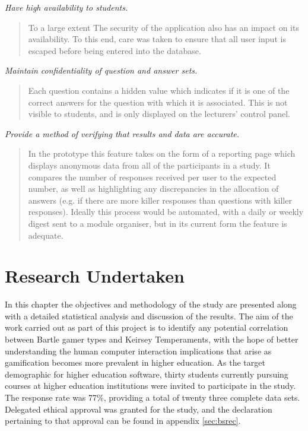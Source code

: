 \documentclass[12pt,a4paper,twoside]{report}
\begin{document}
\textit{Have high availability to students.}
\begin{quote}
To a large extent  The security of the application also has an impact on its availability. To this end, care was taken to ensure that all user input is escaped before being entered into the database.
\end{quote}
\textit{Maintain confidentiality of question and answer sets.}
\begin{quote}
Each question contains a hidden value which indicates if it is one of the correct answers for the question with which it is associated. This is not visible to students, and is only displayed on the lecturers' control panel.
\end{quote}
\textit{Provide a method of verifying that results and data are accurate.}
\begin{quote}
	In the prototype this feature takes on the form of a reporting page which displays anonymous data from all of the participants in a study. It compares the number of responses received per user to the expected number, as well as highlighting any discrepancies in the allocation of answers (e.g. if there are more killer responses than questions with killer responses). Ideally this process would be automated, with a daily or weekly digest sent to a module organiser, but in its current form the feature is adequate.
\end{quote}

\chapter{Research Undertaken}
\label{sec:research}
In this chapter the objectives and methodology of the study are presented along with a detailed statistical analysis and discussion of the results. The aim of the work carried out as part of this project is to identify any potential correlation between Bartle gamer types and Keirsey Temperaments, with the hope of better understanding the human computer interaction implications that arise as gamification becomes more prevalent in higher education. As the target demographic for higher education software, thirty students currently pursuing courses at higher education institutions were invited to participate in the study. The response rate was 77\%, providing a total of twenty three complete data sets. Delegated ethical approval was granted for the study, and the declaration pertaining to that approval can be found in appendix \ref{sec:bsrec}.
\end{document}
